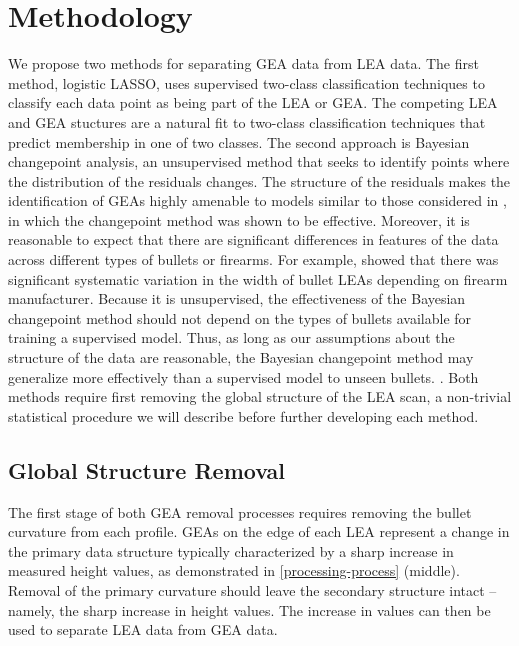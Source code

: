 \documentclass[12pt]{article}
\begin{document}
\section{Methodology}

We propose two methods for separating GEA data from LEA data. The first
method, logistic LASSO, uses supervised two-class classification
techniques to classify each data point as being part of the LEA or GEA.
The competing LEA and GEA stuctures are a natural fit to two-class
classification techniques that predict membership in one of two classes.
The second approach is Bayesian changepoint analysis, an unsupervised
method that seeks to identify points where the distribution of the
residuals changes. The structure of the residuals makes the
identification of GEAs highly amenable to models similar to those
considered in \citep{stephens1994}, in which the changepoint method was
shown to be effective. Moreover, it is reasonable to expect that there
are significant differences in features of the data across different
types of bullets or firearms. For example, \citep{Chu1} showed that
there was significant systematic variation in the width of bullet LEAs
depending on firearm manufacturer. Because it is unsupervised, the
effectiveness of the Bayesian changepoint method should not depend on
the types of bullets available for training a supervised model. Thus, as
long as our assumptions about the structure of the data are reasonable,
the Bayesian changepoint method may generalize more effectively than a
supervised model to unseen bullets.
{\color{purple}{Should add why we started to try Bayesian changepoint analysis, for example good performance in literature or similar data}}.
Both methods require first removing the global structure of the LEA
scan, a non-trivial statistical procedure we will describe before
further developing each method.

\subsection{Global Structure Removal}

The first stage of both GEA removal processes requires removing the
bullet curvature from each profile. GEAs on the edge of each LEA
represent a change in the primary data structure typically characterized
by a sharp increase in measured height values, as demonstrated in
\autoref{processing-process} (middle). Removal of the primary curvature
should leave the secondary structure intact -- namely, the sharp
increase in height values. The increase in values can then be used to
separate LEA data from GEA data.
\end{document}
